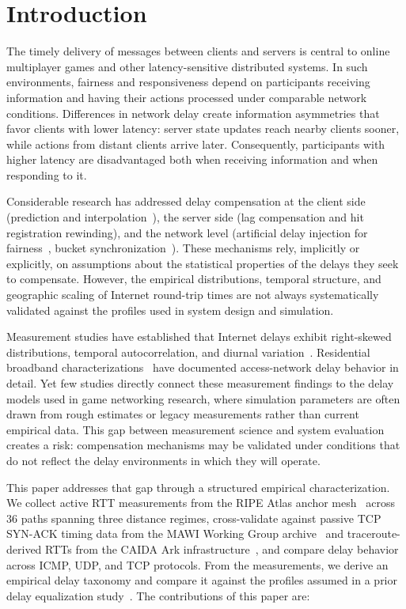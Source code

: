 \documentclass[conference]{IEEEtran}
\begin{document}
\section{Introduction}

The timely delivery of messages between clients and servers is central to online multiplayer games and other latency-sensitive distributed systems. In such environments, fairness and responsiveness depend on participants receiving information and having their actions processed under comparable network conditions. Differences in network delay create information asymmetries that favor clients with lower latency: server state updates reach nearby clients sooner, while actions from distant clients arrive later. Consequently, participants with higher latency are disadvantaged both when receiving information and when responding to it.

Considerable research has addressed delay compensation at the client side (prediction and interpolation~\cite{bernier2001}), the server side (lag compensation and hit registration rewinding), and the network level (artificial delay injection for fairness~\cite{brun2006}, bucket synchronization~\cite{cronin2004}). These mechanisms rely, implicitly or explicitly, on assumptions about the statistical properties of the delays they seek to compensate. However, the empirical distributions, temporal structure, and geographic scaling of Internet round-trip times are not always systematically validated against the profiles used in system design and simulation.

Measurement studies have established that Internet delays exhibit right-skewed distributions, temporal autocorrelation, and diurnal variation~\cite{paxson1999}. Residential broadband characterizations~\cite{dischinger2007, sundaresan2011} have documented access-network delay behavior in detail. Yet few studies directly connect these measurement findings to the delay models used in game networking research, where simulation parameters are often drawn from rough estimates or legacy measurements rather than current empirical data. This gap between measurement science and system evaluation creates a risk: compensation mechanisms may be validated under conditions that do not reflect the delay environments in which they will operate.

This paper addresses that gap through a structured empirical characterization. We collect active RTT measurements from the RIPE Atlas anchor mesh~\cite{ripeatlas} across 36 paths spanning three distance regimes, cross-validate against passive TCP SYN-ACK timing data from the MAWI Working Group archive~\cite{mawi} and traceroute-derived RTTs from the CAIDA Ark infrastructure~\cite{caida}, and compare delay behavior across ICMP, UDP, and TCP protocols. From the measurements, we derive an empirical delay taxonomy and compare it against the profiles assumed in a prior delay equalization study~\cite{companion}. The contributions of this paper are:
\end{document}
